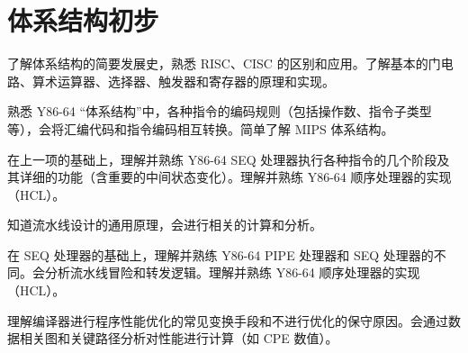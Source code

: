 \chapter{体系结构初步}
    \begin{summary}
        \begin{compactitem}
            \item 了解体系结构的简要发展史，熟悉 RISC、CISC 的区别和应用。了解基本的门电路、算术运算器、选择器、触发器和寄存器的原理和实现。
            \item 熟悉 Y86-64 “体系结构”中，各种指令的编码规则（包括操作数、指令子类型等），会将汇编代码和指令编码相互转换。简单了解 MIPS 体系结构。
            \item 在上一项的基础上，理解并熟练 Y86-64 SEQ 处理器执行各种指令的几个阶段及其详细的功能（含重要的中间状态变化）。理解并熟练 Y86-64 顺序处理器的实现（HCL）。
            \item 知道流水线设计的通用原理，会进行相关的计算和分析。
            \item 在 SEQ 处理器的基础上，理解并熟练 Y86-64 PIPE 处理器和 SEQ 处理器的不同。会分析流水线冒险和转发逻辑。理解并熟练 Y86-64 顺序处理器的实现（HCL）。
            \item 理解编译器进行程序性能优化的常见变换手段和不进行优化的保守原因。会通过数据相关图和关键路径分析对性能进行计算（如 CPE 数值）。
        \end{compactitem}
    \end{summary}

